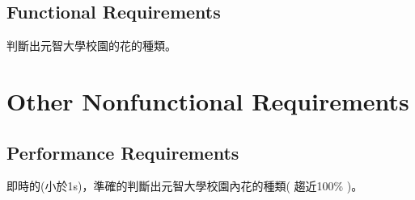 \documentclass{scrreprt}
\begin{document}
\section{Functional Requirements}
\begin{CJK}{UTF8}{bkai}
	判斷出元智大學校園的花的種類。
\end{CJK}

\chapter{Other Nonfunctional Requirements}

\section{Performance Requirements}
\begin{CJK}{UTF8}{bkai}
	即時的(小於1s)，準確的判斷出元智大學校園內花的種類( 趨近100\% )。
\end{CJK}
\end{document}
